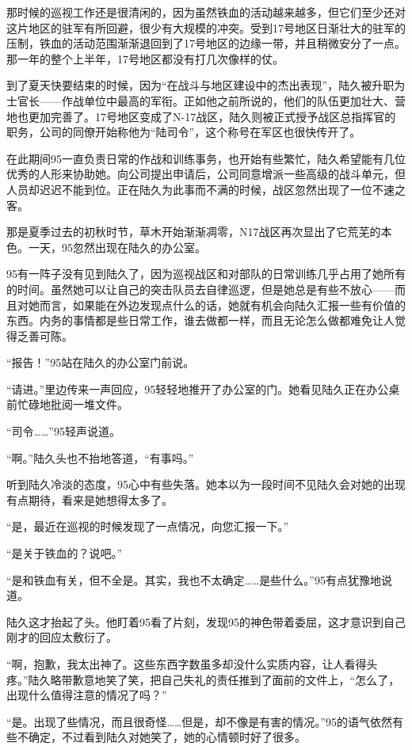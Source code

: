 那时候的巡视工作还是很清闲的，因为虽然铁血的活动越来越多，但它们至少还对这片地区的驻军有所回避，很少有大规模的冲突。受到17号地区日渐壮大的驻军的压制，铁血的活动范围渐渐退回到了17号地区的边缘一带，并且稍微安分了一点。那一年的整个上半年，17号地区都没有打几次像样的仗。

到了夏天快要结束的时候，因为“在战斗与地区建设中的杰出表现”，陆久被升职为士官长——作战单位中最高的军衔。正如他之前所说的，他们的队伍更加壮大、营地也更加完善了。17号地区变成了N-17战区，陆久则被正式授予战区总指挥官的职务，公司的同僚开始称他为“陆司令”，这个称号在军区也很快传开了。

在此期间95一直负责日常的作战和训练事务，也开始有些繁忙，陆久希望能有几位优秀的人形来协助她。向公司提出申请后，公司同意增派一些高级的战斗单元，但人员却迟迟不能到位。正在陆久为此事而不满的时候，战区忽然出现了一位不速之客。

那是夏季过去的初秋时节，草木开始渐渐凋零，N17战区再次显出了它荒芜的本色。一天，95忽然出现在陆久的办公室。

95有一阵子没有见到陆久了，因为巡视战区和对部队的日常训练几乎占用了她所有的时间。虽然她可以让自己的突击队员去自律巡逻，但是她总是有些不放心——而且对她而言，如果能在外边发现点什么的话，她就有机会向陆久汇报一些有价值的东西。内务的事情都是些日常工作，谁去做都一样，而且无论怎么做都难免让人觉得乏善可陈。

“报告！”95站在陆久的办公室门前说。

“请进。”里边传来一声回应，95轻轻地推开了办公室的门。她看见陆久正在办公桌前忙碌地批阅一堆文件。

“司令……”95轻声说道。

“啊。”陆久头也不抬地答道，“有事吗。”

听到陆久冷淡的态度，95心中有些失落。她本以为一段时间不见陆久会对她的出现有点期待，看来是她想得太多了。

“是，最近在巡视的时候发现了一点情况，向您汇报一下。”

“是关于铁血的？说吧。”

“是和铁血有关，但不全是。其实，我也不太确定……是些什么。”95有点犹豫地说道。

陆久这才抬起了头。他盯着95看了片刻，发现95的神色带着委屈，这才意识到自己刚才的回应太敷衍了。

“啊，抱歉，我太出神了。这些东西字数虽多却没什么实质内容，让人看得头疼。”陆久略带歉意地笑了笑，把自己失礼的责任推到了面前的文件上，“怎么了，出现什么值得注意的情况了吗？”

“是。出现了些情况，而且很奇怪……但是，却不像是有害的情况。”95的语气依然有些不确定，不过看到陆久对她笑了，她的心情顿时好了很多。

